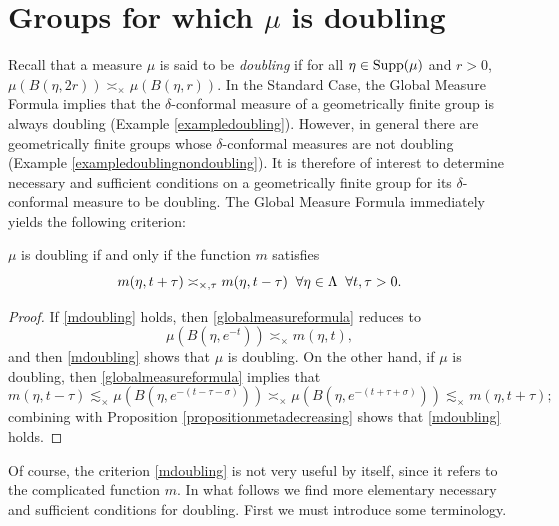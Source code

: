 \section{Groups for which $\mu$ is doubling}
\label{subsectiondoubling}

Recall that a measure $\mu$ is said to be \emph{doubling} if for all $\eta\in\operatorname{Supp}(\mu)$ and $r > 0$, $\mu(B(\eta,2r)) \asymp_\times \mu(B(\eta,r))$. In the Standard Case, the Global Measure Formula implies that the $\delta$-conformal measure of a geometrically finite group is always doubling (Example \ref{exampledoubling}). However, in general there are geometrically finite groups whose $\delta$-conformal measures are not doubling (Example \ref{exampledoublingnondoubling}). It is therefore of interest to determine necessary and sufficient conditions on a geometrically finite group for its $\delta$-conformal measure to be doubling. The Global Measure Formula immediately yields the following criterion:%


\begin{lemma}
$\mu$ is doubling if and only if the function $m$ satisfies
\begin{equation}
\label{mdoubling}
m(\eta,t + \tau) \asymp_{\times,\tau} m(\eta,t - \tau) \;\;\forall \eta\in\Lambda \;\;\forall t,\tau > 0.
\end{equation}
\end{lemma}
\begin{proof}
If \eqref{mdoubling} holds, then \eqref{globalmeasureformula} reduces to
\begin{equation}
\label{globalmeasureformula2}
\mu(B(\eta,e^{-t})) \asymp_\times m(\eta,t),
\end{equation}
and then \eqref{mdoubling} shows that $\mu$ is doubling. On the other hand, if $\mu$ is doubling, then \eqref{globalmeasureformula} implies that
\[
m(\eta,t - \tau) \lesssim_\times \mu(B(\eta,e^{-(t - \tau - \sigma)})) \asymp_\times \mu(B(\eta,e^{-(t + \tau + \sigma)})) \lesssim_\times m(\eta,t + \tau);
\]
combining with Proposition \ref{propositionmetadecreasing} shows that \eqref{mdoubling} holds.
\end{proof}

Of course, the criterion \eqref{mdoubling} is not very useful by itself, since it refers to the complicated function $m$. In what follows we find more elementary necessary and sufficient conditions for doubling. First we must introduce some terminology.

